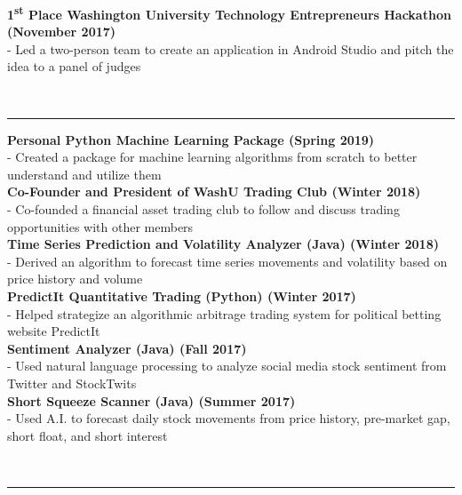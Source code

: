 \documentclass[12pt]{article}
\begin{document}
\begin{titlepage}
\begin{addmargin}[1em]{0em}
			\textbf{1\textsuperscript{st} Place Washington University Technology Entrepreneurs Hackathon \hfill (November 2017)}\\
- Led a two-person team to create an application in Android Studio and pitch the idea to a panel of judges \\
		\end{addmargin}
		\vspace{-10pt}
		\noindent
		\\\rule{\textwidth}{0.4pt}
		\begin{addmargin}[1em]{0em}
			\textbf{Personal Python Machine Learning Package \space \href{https://github.com/Peter123Petev/brain-Machine-Learning-A.I.}{\faGithubSquare}\hfill (Spring 2019)}\\
- Created a package for machine learning algorithms from scratch to better understand and utilize them\\
			\textbf{Co-Founder and President of WashU Trading Club \hfill (Winter 2018)}\\
- Co-founded a financial asset trading club to follow and discuss trading opportunities with other members\\
			\textbf{Time Series Prediction and Volatility Analyzer (Java) \hfill (Winter 2018)}\\
- Derived an algorithm to forecast time series movements and volatility based on price history and volume \\
			\textbf{PredictIt Quantitative Trading (Python) \hfill (Winter 2017)}\\
- Helped strategize an algorithmic arbitrage trading system for political betting website PredictIt \\
			\textbf{Sentiment Analyzer (Java) \hfill (Fall 2017)}\\
- Used natural language processing to analyze social media stock sentiment from Twitter and StockTwits\\
			\textbf{Short Squeeze Scanner (Java) \hfill (Summer 2017)}\\
- Used A.I. to forecast daily stock movements from price history, pre-market gap, short float, and short interest\\
		\end{addmargin}
		\vspace{-10pt}
		\noindent
		\\\rule{\textwidth}{0.4pt}

\end{titlepage}
\end{document}
